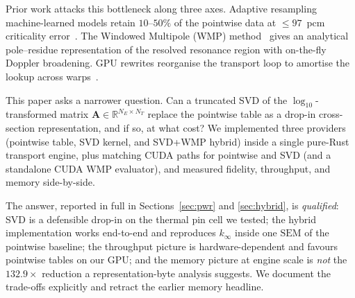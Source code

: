 \documentclass[11pt,a4paper]{article}
\begin{document}
Prior work attacks this bottleneck along three axes. Adaptive
resampling machine-learned models retain $10$--$50\%$ of the
pointwise data at $\leq 97$~pcm criticality
error~\cite{ml_resampling_2025,ml_fullcore_2026}. The
Windowed Multipole (WMP)
method~\cite{josey2015wmp,forget2014wmp,hybrid_wn_2021} gives
an analytical pole--residue representation of the resolved
resonance region with on-the-fly Doppler broadening. GPU
rewrites reorganise the transport loop to amortise the lookup
across warps~\cite{tramm2024,tramm2014xsbench}.

This paper asks a narrower question. Can a truncated SVD of
the $\log_{10}$-transformed matrix $\mathbf{A} \in
\mathbb{R}^{N_E \times N_T}$ replace the pointwise table as a
drop-in cross-section representation, and if so, at what
cost? We implemented three providers (pointwise table, SVD
kernel, and SVD+WMP hybrid) inside a single pure-Rust
transport engine, plus matching CUDA paths for pointwise and
SVD (and a standalone CUDA WMP evaluator), and measured
fidelity, throughput, and memory side-by-side.

The answer, reported in full in Sections~\ref{sec:pwr} and
\ref{sec:hybrid}, is \emph{qualified}: SVD is a defensible
drop-in on the thermal pin cell we tested; the hybrid
implementation works end-to-end and reproduces $k_\infty$
inside one $\mathrm{SEM}$ of the pointwise baseline; the
throughput picture is hardware-dependent and favours pointwise
tables on our GPU; and the memory picture at engine scale is
\emph{not} the $132.9\times$ reduction a representation-byte
analysis suggests. We document the trade-offs explicitly and
retract the earlier memory headline.
\end{document}
